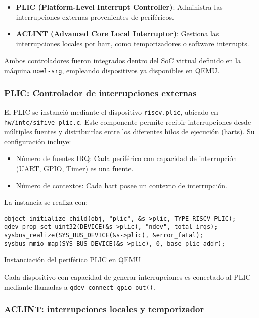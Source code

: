 \begin{itemize}
    \item \textbf{PLIC (Platform-Level Interrupt Controller)}: Administra las interrupciones externas provenientes de periféricos.
    \item \textbf{ACLINT (Advanced Core Local Interruptor)}: Gestiona las interrupciones locales por hart, como temporizadores o software interrupts.
\end{itemize}

Ambos controladores fueron integrados dentro del SoC virtual definido en la máquina \texttt{noel-srg}, empleando dispositivos ya disponibles en QEMU.

\subsubsection*{PLIC: Controlador de interrupciones externas}

El PLIC se instanció mediante el dispositivo \texttt{riscv.plic}, ubicado en \texttt{hw/intc/sifive\_plic.c}. Este componente permite recibir interrupciones desde múltiples fuentes y distribuirlas entre los diferentes hilos de ejecución (harts). Su configuración incluye:

\begin{itemize}
    \item Número de fuentes IRQ: Cada periférico con capacidad de interrupción (UART, GPIO, Timer) es una fuente.
    \item Número de contextos: Cada hart posee un contexto de interrupción.
\end{itemize}

La instancia se realiza con:

\begin{codefloat}
\begin{lstlisting}[style=CppExample]
object_initialize_child(obj, "plic", &s->plic, TYPE_RISCV_PLIC);
qdev_prop_set_uint32(DEVICE(&s->plic), "ndev", total_irqs);
sysbus_realize(SYS_BUS_DEVICE(&s->plic), &error_fatal);
sysbus_mmio_map(SYS_BUS_DEVICE(&s->plic), 0, base_plic_addr);
\end{lstlisting}
\caption{Instanciación del periférico PLIC en QEMU}
\end{codefloat}

Cada dispositivo con capacidad de generar interrupciones es conectado al PLIC mediante llamadas a \texttt{qdev\_connect\_gpio\_out()}.

\subsubsection*{ACLINT: interrupciones locales y temporizador}

